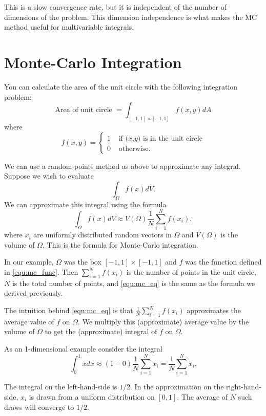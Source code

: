 This is a slow convergence rate, but it is independent of the number of dimensions of the problem.
This dimension independence is what makes the MC method useful for multivariable integrals.

\section*{Monte-Carlo Integration}

You can calculate the area of the unit circle with the following integration problem:
\[
\mbox{Area of unit circle } = \int_{[-1,1]\times[-1,1]} f(x,y) dA
\]
where
\begin{equation}\label{equ:mc_func}
f(x,y) = \begin{cases} 1 &\mbox{ if $(x$,$y)$ is in the unit circle} \\ 0 &\mbox{ otherwise.} \end{cases}
\end{equation}

We can use a random-points method as above to approximate any integral.
Suppose we wish to evaluate
\[
\int_\Omega f(x) dV.
\]
We can approximate this integral using the formula
\begin{equation}\label{equ:mc_eq}
\int_\Omega f(x) dV \approx V(\Omega) \frac{1}{N} \sum_{i=1}^N f(x_i),
\end{equation}
where $x_i$ are uniformly distributed random vectors in $\Omega$ and $V(\Omega)$ is the volume of $\Omega$.
This is the formula for Monte-Carlo integration.


In our example, $\Omega$ was the box $[-1,1] \times [-1,1]$ and $f$ was the function defined in \eqref{equ:mc_func}.
Then $\sum_{i=1}^N f(x_i)$ is the number of points in the unit circle, $N$ is the total number of points, and \eqref{equ:mc_eq} is the same as the formula we derived previously.

The intuition behind \eqref{equ:mc_eq} is that $\frac{1}{N} \sum_{i=1}^N f(x_i)$ approximates the average value of $f$ on $\Omega$.
We multiply this (approximate) average value by the volume of $\Omega$ to get the (approximate) integral of $f$ on $\Omega$.

As an 1-dimensional example consider the integral
\[
\int_0^1 x dx \approx (1-0)\frac{1}{N} \sum_{i=1}^N x_i=\frac{1}{N} \sum_{i=1}^N x_i.
\]

The integral on the left-hand-side is $1/2$.
In the approximation on the right-hand-side, $x_i$ is drawn from a uniform distribution on $[0,1]$.
The average of $N$ such draws will converge to $1/2$.

